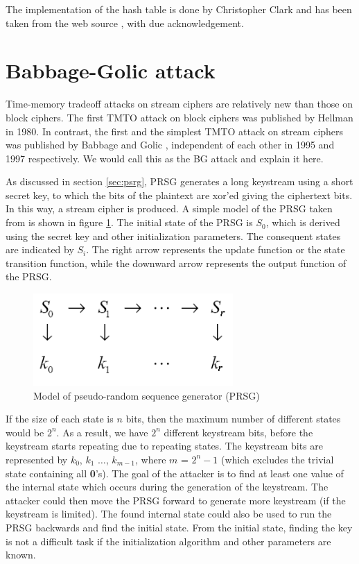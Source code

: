 The implementation of the hash table is done by Christopher Clark and has been taken from the web source \cite{hash-table-impl}, with due acknowledgement. 


\section{Babbage-Golic attack}
Time-memory tradeoff attacks on stream ciphers are relatively new than those on block ciphers. The first TMTO attack on block ciphers was published by Hellman in 1980. In contrast, the first and the simplest TMTO attack on stream ciphers was published by Babbage \cite{babbage} and Golic \cite{golic}, independent of each other in 1995 and 1997 respectively. We would call this as the BG attack and explain it here. 

As discussed in section \ref{sec:psrg}, PRSG generates a long keystream using a short secret key, to which the bits of the plaintext are xor'ed giving the ciphertext bits. In this way, a stream cipher is produced. A simple model of the PRSG taken from \cite{babbage} is shown in figure \ref{fig:psrg-model}. The initial state of the PRSG is $S_0$, which is derived using the secret key and other initialization parameters. The consequent states are indicated by $S_i$. The right arrow represents the update function or the state transition function, while the downward arrow represents the output function of the PRSG.

\begin{figure}[h]
	\centering
	\includegraphics[width=3in]{./figures/prsgmodel.png}
	\caption{Model of pseudo-random sequence generator (PRSG)}	
	\label{fig:psrg-model}
\end{figure}

If the size of each state is $n$ bits, then the maximum number of different states would be $2^n$. As a result, we have $2^n$ different keystream bits, before the keystream starts repeating due to repeating states. The keystream bits are represented by $k_0$, $k_1$ $\ldots$, $k_{m-1}$, where $m$ = $2^{n} - 1$ (which excludes the trivial state containing all \textbf{0}'s). The goal of the attacker is to find at least one value of the internal state which occurs during the generation of the keystream. The attacker could then move the PRSG forward to generate more keystream (if the keystream is limited). The found internal state could also be used to run the PRSG backwards and find the initial state. From the initial state, finding the key is not a difficult task if the initialization algorithm and other parameters are known.\\

